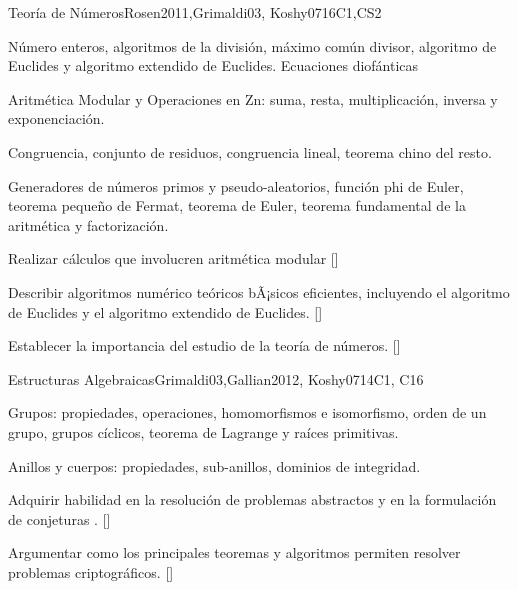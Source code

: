 \begin{syllabus}
\begin{unit}{}{Teoría de Números}{Rosen2011,Grimaldi03, Koshy07}{16}{C1,CS2}
   \begin{topics}
    	\item Número enteros, algoritmos de la división, máximo común divisor, algoritmo de Euclides y algoritmo extendido de Euclides. Ecuaciones diofánticas
    	\item Aritmética Modular y Operaciones en Zn: suma, resta, multiplicación, inversa y exponenciación.
	\item Congruencia, conjunto de residuos, congruencia lineal, teorema chino del resto.
	\item Generadores de números primos y pseudo-aleatorios, función phi de Euler, teorema pequeño de Fermat, teorema de Euler, teorema fundamental de la aritmética y factorización.			
   \end{topics}
   \begin{learningoutcomes}
      	\item  Realizar cálculos que involucren aritmética modular [\Usage]
	\item  Describir algoritmos numérico teóricos bÃ¡sicos eficientes, incluyendo el algoritmo de Euclides y el algoritmo extendido de Euclides. [\Assessment]
	\item Establecer la importancia del estudio de la teoría de números. [\Familiarity]
	\item \IASCryptographyLODiscussThePrime [\Familiarity]
   \end{learningoutcomes}
\end{unit}

\begin{unit}{}{Estructuras Algebraicas}{Grimaldi03,Gallian2012, Koshy07}{14}{C1, C16}
   \begin{topics}
    	\item Grupos: propiedades, operaciones, homomorfismos e isomorfismo, orden de un grupo, grupos cíclicos, teorema de Lagrange y raíces primitivas.
    	\item Anillos y cuerpos: propiedades, sub-anillos, dominios de integridad.
   \end{topics}
   \begin{learningoutcomes}
	\item  Adquirir habilidad en la resolución de problemas abstractos y en la formulación de conjeturas . [\Familiarity]
	\item Argumentar como los principales teoremas y algoritmos permiten resolver problemas criptográficos. [\Assessment]
   \end{learningoutcomes}
\end{unit}


\end{syllabus}
